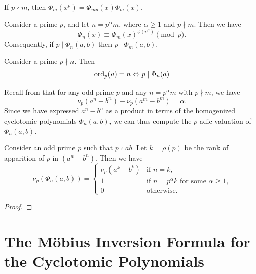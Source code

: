 \begin{lemma}
  If $p\nmid m$, then $\Phi_m(x^p)=\Phi_{mp}(x)\Phi_m(x)$.
\end{lemma}

\begin{lemma}
  Consider a prime $p$, and let $n=p^\alpha m$, where $\alpha\geq 1$ and $p\nmid m$. Then we have
  \begin{equation*}
    \Phi_n(x)\equiv \Phi_m(x)^{\phi(p^\alpha)}\pmod{p}.
  \end{equation*}
  Consequently, if $p\mid\Phi_n(a,b)$ then $p\mid \Phi_m(a,b)$.
\end{lemma}

\begin{proposition}
  Consider a prime $p\nmid n$. Then 
  \begin{equation*}
    \operatorname{ord}_p(a)= n \Leftrightarrow p\mid \Phi_n(a)
  \end{equation*}
\end{proposition}

Recall from  that for any odd prime $p$ and any $n=p^\alpha m$ with $p\nmid m$, we have
\begin{equation*}
  \nu_p(a^n-b^n)-\nu_p(a^m-b^m)=\alpha.
\end{equation*}
Since we have expressed $a^n-b^n$ as a product in terms of the homogenized cyclotomic polynomials $\Phi_n(a,b)$, we can thus compute the $p$-adic valuation of $\Phi_n(a,b)$.

\begin{proposition}\label{proposition:valuation-homogenized-cyclotomics}
  Consider an odd prime $p$ such that $p\nmid ab$. Let $k=\rho(p)$ be the rank of apparition of $p$ in $(a^n-b^n)$. Then we have
  \begin{equation*}
    \nu_p(\Phi_n(a,b)) =
    \begin{cases}
      \nu_p(a^k-b^k) & \text{if $n=k$,} \\
      1 & \text{if $n=p^\alpha k$ for some $\alpha\geq 1$,} \\
      0 & \text{otherwise.}
    \end{cases}
  \end{equation*}
\end{proposition}

\begin{proof}
  
\end{proof}

\section{The M\"obius Inversion Formula for the Cyclotomic Polynomials}

